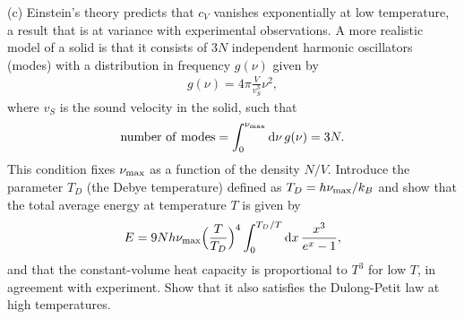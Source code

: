 {(c) Einstein's theory predicts that $c_{V}$ vanishes exponentially at low temperature, a result that is at variance with experimental observations.
A more realistic model of a solid is that it consists of $3N$ independent harmonic oscillators (modes) with a distribution in frequency $g(\nu)$ given by
\begin{eqnarray}
    g(\nu) = 4\pi \frac{V}{v_{S}^3} \nu^2
,\end{eqnarray}
where $v_{S}$ is the sound velocity in the solid, such that 
\begin{eqnarray}
    {\rm number~of~modes} = \int_{0}^{\nu_{\rm max}} \dd{\nu} g(\nu) = 3N
.\end{eqnarray}
This condition fixes $\nu_{\rm max}$ as a function of the density $N/V$.
Introduce the parameter $T_{D}$ (the Debye temperature) defined as $T_{D} = h \nu_{\rm max}/k_{B}$ and show that the total average energy at temperature $T$ is given by
\begin{eqnarray}
    E = 9 N h \nu_{\rm max} \Big( \frac{T}{T_{D}} \Big)^{4} \int_{0}^{T_{D}/T} \dd{x} \frac{x^3}{e^{x} - 1}
,\end{eqnarray}
and that the constant-volume heat capacity is proportional to $T^3$ for low $T$, in agreement with experiment.
Show that it also satisfies the Dulong-Petit law at high temperatures.

}


